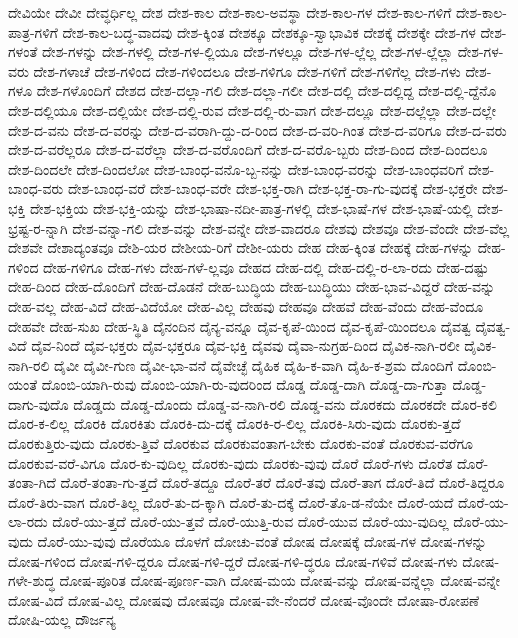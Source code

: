 {ದೇವಿಯೇ
ದೇವೀ
ದೇವ್ಧರ್ಧಿಲ್ಲ
ದೇಶ
ದೇಶ-ಕಾಲ
ದೇಶ-ಕಾಲ-ಅವಸ್ಥಾ
ದೇಶ-ಕಾಲ-ಗಳ
ದೇಶ-ಕಾಲ-ಗಳಿಗೆ
ದೇಶ-ಕಾಲ-ಪಾತ್ರ-ಗಳಿಗೆ
ದೇಶ-ಕಾಲ-ಬದ್ಧ-ವಾದವು
ದೇಶ-ಕ್ಕಿಂತ
ದೇಶಕ್ಕೂ
ದೇಶಕ್ಕೂ-ಸ್ವಾಭಾವಿಕ
ದೇಶಕ್ಕೆ
ದೇಶಕ್ಕೇ
ದೇಶ-ಗಳ
ದೇಶ-ಗಳಂತೆ
ದೇಶ-ಗಳನ್ನು
ದೇಶ-ಗಳಲ್ಲಿ
ದೇಶ-ಗಳ-ಲ್ಲಿಯೂ
ದೇಶ-ಗಳಲ್ಲೂ
ದೇಶ-ಗಳ-ಲ್ಲೆಲ್ಲ
ದೇಶ-ಗಳ-ಲ್ಲೆಲ್ಲಾ
ದೇಶ-ಗಳ-ವರು
ದೇಶ-ಗಳಾಚೆ
ದೇಶ-ಗಳಿಂದ
ದೇಶ-ಗಳಿಂದಲೂ
ದೇಶ-ಗಳಿಗೂ
ದೇಶ-ಗಳಿಗೆ
ದೇಶ-ಗಳಿಗೆಲ್ಲ
ದೇಶ-ಗಳು
ದೇಶ-ಗಳೂ
ದೇಶ-ಗಳೊಂದಿಗೆ
ದೇಶದ
ದೇಶ-ದಲ್ಲಾ-ಗಲಿ
ದೇಶ-ದಲ್ಲಾ-ಗಲೀ
ದೇಶ-ದಲ್ಲಿ
ದೇಶ-ದಲ್ಲಿದ್ದ
ದೇಶ-ದಲ್ಲಿ-ದ್ದೆನೊ
ದೇಶ-ದಲ್ಲಿಯೂ
ದೇಶ-ದಲ್ಲಿಯೇ
ದೇಶ-ದಲ್ಲಿ-ರುವ
ದೇಶ-ದಲ್ಲಿ-ರು-ವಾಗ
ದೇಶ-ದಲ್ಲೂ
ದೇಶ-ದಲ್ಲೆಲ್ಲಾ
ದೇಶ-ದಲ್ಲೇ
ದೇಶ-ದ-ವನು
ದೇಶ-ದ-ವರನ್ನು
ದೇಶ-ದ-ವರಾಗಿ-ದ್ದು-ದ-ರಿಂದ
ದೇಶ-ದ-ವರಿ-ಗಿಂತ
ದೇಶ-ದ-ವರಿಗೂ
ದೇಶ-ದ-ವರು
ದೇಶ-ದ-ವರೆಲ್ಲರೂ
ದೇಶ-ದ-ವರೆಲ್ಲಾ
ದೇಶ-ದ-ವರೊಂದಿಗೆ
ದೇಶ-ದ-ವರೊ-ಬ್ಬರು
ದೇಶ-ದಿಂದ
ದೇಶ-ದಿಂದಲೂ
ದೇಶ-ದಿಂದಲೇ
ದೇಶ-ದಿಂದಲೋ
ದೇಶ-ಬಾಂಧ-ವನೊ-ಬ್ಬ-ನನ್ನು
ದೇಶ-ಬಾಂಧ-ವರನ್ನು
ದೇಶ-ಬಾಂಧವರಿಗೆ
ದೇಶ-ಬಾಂಧ-ವರು
ದೇಶ-ಬಾಂಧ-ವರೆ
ದೇಶ-ಬಾಂಧ-ವರೇ
ದೇಶ-ಭಕ್ತ-ರಾಗಿ
ದೇಶ-ಭಕ್ತ-ರಾ-ಗು-ವುದಕ್ಕೆ
ದೇಶ-ಭಕ್ತರೇ
ದೇಶ-ಭಕ್ತಿ
ದೇಶ-ಭಕ್ತಿಯ
ದೇಶ-ಭಕ್ತಿ-ಯನ್ನು
ದೇಶ-ಭಾಷಾ-ನದೀ-ಪಾತ್ರ-ಗಳಲ್ಲಿ
ದೇಶ-ಭಾಷೆ-ಗಳ
ದೇಶ-ಭಾಷೆ-ಯಲ್ಲಿ
ದೇಶ-ಭ್ರಷ್ಟ-ರ-ನ್ನಾಗಿ
ದೇಶ-ವನ್ನಾ-ಗಲಿ
ದೇಶ-ವನ್ನು
ದೇಶ-ವನ್ನೇ
ದೇಶ-ವಾದರೂ
ದೇಶವು
ದೇಶವೂ
ದೇಶ-ವೆಂದೇ
ದೇಶ-ವೆಲ್ಲ
ದೇಶವೇ
ದೇಶಾದ್ಯಂತವೂ
ದೇಶಿ-ಯರ
ದೇಶೀಯ-ರಿಗೆ
ದೇಶೀ-ಯರು
ದೇಹ
ದೇಹ-ಕ್ಕಿಂತ
ದೇಹಕ್ಕೆ
ದೇಹ-ಗಳನ್ನು
ದೇಹ-ಗಳಿಂದ
ದೇಹ-ಗಳಿಗೂ
ದೇಹ-ಗಳು
ದೇಹ-ಗಳೆ-ಲ್ಲವೂ
ದೇಹದ
ದೇಹ-ದಲ್ಲಿ
ದೇಹ-ದಲ್ಲಿ-ರ-ಲಾ-ರದು
ದೇಹ-ದಷ್ಟು
ದೇಹ-ದಿಂದ
ದೇಹ-ದೊಂದಿಗೆ
ದೇಹ-ದೊಡನೆ
ದೇಹ-ಬುದ್ಧಿಯ
ದೇಹ-ಬುದ್ಧಿಯು
ದೇಹ-ಭಾವ-ವಿದ್ದರೆ
ದೇಹ-ವನ್ನು
ದೇಹ-ವಲ್ಲ
ದೇಹ-ವಿದೆ
ದೇಹ-ವಿದೆಯೋ
ದೇಹ-ವಿಲ್ಲ
ದೇಹವು
ದೇಹವೂ
ದೇಹವೆ
ದೇಹ-ವೆಂದು
ದೇಹ-ವೆಂದೂ
ದೇಹವೇ
ದೇಹ-ಸುಖ
ದೇಹ-ಸ್ಥಿತಿ
ದೈನಂದಿನ
ದೈನ್ಯ-ವನ್ನೂ
ದೈವ-ಕೃಪೆ-ಯಿಂದ
ದೈವ-ಕೃಪೆ-ಯಿಂದಲೂ
ದೈವತ್ವ
ದೈವತ್ವ-ವಿದೆ
ದೈವ-ನಿಂದೆ
ದೈವ-ಭಕ್ತರು
ದೈವ-ಭಕ್ತರೂ
ದೈವ-ಭಕ್ತಿ
ದೈವವು
ದೈವಾ-ನುಗ್ರಹ-ದಿಂದ
ದೈವಿಕ-ನಾಗಿ-ರಲೀ
ದೈವಿಕ-ನಾಗಿ-ರಲಿ
ದೈವೀ
ದೈವೀ-ಗುಣ
ದೈವೀ-ಭಾ-ವನೆ
ದೈವೇಚ್ಛೆ
ದೈಹಿಕ
ದೈಹಿ-ಕ-ವಾಗಿ
ದೈಹಿ-ಕ-ಶ್ರಮ
ದೊಂದಿಗೆ
ದೊಂಬಿ-ಯಂತೆ
ದೊಂಬಿ-ಯಾಗಿ-ರುವು
ದೊಂಬಿ-ಯಾಗಿ-ರು-ವುದರಿಂದ
ದೊಡ್ಡ
ದೊಡ್ಡ-ದಾಗಿ
ದೊಡ್ಡ-ದಾ-ಗುತ್ತಾ
ದೊಡ್ಡ-ದಾಗು-ವುದೊ
ದೊಡ್ಡದು
ದೊಡ್ಡ-ದೊಂದು
ದೊಡ್ಡ-ವ-ನಾಗಿ-ರಲಿ
ದೊಡ್ಡ-ವನು
ದೊರಕದು
ದೊರಕದೇ
ದೊರ-ಕಲಿ
ದೊರ-ಕ-ಲಿಲ್ಲ
ದೊರಕಿ
ದೊರಕಿತು
ದೊರಕಿ-ದು-ದಕ್ಕೆ
ದೊರಕಿ-ರ-ಲಿಲ್ಲ
ದೊರಕಿ-ಸಿರು-ವುದು
ದೊರಕು-ತ್ತದೆ
ದೊರಕುತ್ತಿರು-ವುದು
ದೊರಕು-ತ್ತಿವೆ
ದೊರಕುವ
ದೊರಕುವಂತಾಗ-ಬೇಕು
ದೊರಕು-ವಂತೆ
ದೊರಕುವ-ವರೆಗೂ
ದೊರಕುವ-ವರೆ-ವಿಗೂ
ದೊರ-ಕು-ವುದಿಲ್ಲ
ದೊರಕು-ವುದು
ದೊರಕು-ವುವು
ದೊರೆ
ದೊರೆ-ಗಳು
ದೊರೆತ
ದೊರೆ-ತಂತಾ-ಗಿದೆ
ದೊರೆ-ತಂತಾ-ಗು-ತ್ತದೆ
ದೊರೆ-ತದ್ದೂ
ದೊರೆ-ತರೆ
ದೊರೆ-ತವು
ದೊರೆ-ತಾಗ
ದೊರೆ-ತಿದೆ
ದೊರೆ-ತಿದ್ದರೂ
ದೊರೆ-ತಿರು-ವಾಗ
ದೊರೆ-ತಿಲ್ಲ
ದೊರೆ-ತು-ದ-ಕ್ಕಾಗಿ
ದೊರೆ-ತು-ದಕ್ಕೆ
ದೊರೆ-ತೊ-ಡ-ನೆಯೇ
ದೊರೆ-ಯದೆ
ದೊರೆ-ಯ-ಲಾ-ರದು
ದೊರೆ-ಯು-ತ್ತದೆ
ದೊರೆ-ಯು-ತ್ತವೆ
ದೊರೆ-ಯುತ್ತಿ-ರುವ
ದೊರೆ-ಯುವ
ದೊರೆ-ಯು-ವುದಿಲ್ಲ
ದೊರೆ-ಯು-ವುದು
ದೊರೆ-ಯು-ವುವು
ದೊರೆಯೂ
ದೊಳಗೆ
ದೋಚು-ವಂತೆ
ದೋಷ
ದೋಷಕ್ಕೆ
ದೋಷ-ಗಳ
ದೋಷ-ಗಳನ್ನು
ದೋಷ-ಗಳಿಂದ
ದೋಷ-ಗಳಿ-ದ್ದರೂ
ದೋಷ-ಗಳಿ-ದ್ದರೆ
ದೋಷ-ಗಳಿ-ದ್ಧರೂ
ದೋಷ-ಗಳಿವೆ
ದೋಷ-ಗಳು
ದೋಷ-ಗಳೇ-ಶುದ್ಧ
ದೋಷ-ಪೂರಿತ
ದೋಷ-ಪೂರ್ಣ-ವಾಗಿ
ದೋಷ-ಮಯ
ದೋಷ-ವನ್ನು
ದೋಷ-ವನ್ನೆಲ್ಲಾ
ದೋಷ-ವನ್ನೇ
ದೋಷ-ವಿದೆ
ದೋಷ-ವಿಲ್ಲ
ದೋಷವು
ದೋಷವೂ
ದೋಷ-ವೇ-ನೆಂದರೆ
ದೋಷ-ವೊಂದೇ
ದೋಷಾ-ರೋಪಣೆ
ದೋಷಿ-ಯಲ್ಲ
ದೌರ್ಜನ್ಯ
}
